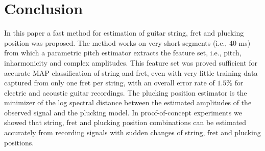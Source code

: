 \documentclass{article}
\begin{document}
\section{Conclusion} 
\label{sec:conclusion}
In this paper a fast method for estimation of guitar string, fret and plucking position was proposed. The method works on very short segments (i.e., 40 ms) from which a parametric pitch estimator extracts the feature set, i.e., pitch, inharmonicity and complex amplitudes. This feature set was proved sufficient for accurate MAP classification of string and fret, even with very little training data captured from only one fret per string, with an overall error rate of $1.5\%$ for electric and acoustic guitar recordings.
%
%
%
The plucking position estimator is the minimizer of the log spectral distance between the estimated amplitudes of the observed signal and the plucking model. In proof-of-concept experiments we showed that
string, fret and plucking position combinations can be estimated accurately from recording signals with sudden changes  of string, fret and plucking positions.
%
%
%
%
%
\vfill\pagebreak

%

\end{document}
